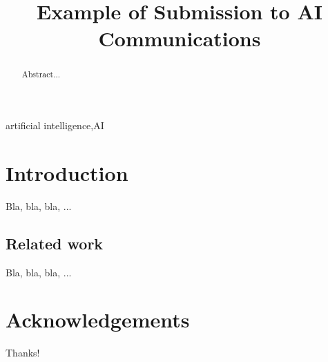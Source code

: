 \documentclass{aicom2e}
\begin{document}
\begin{frontmatter}                           %
%
\title{Example of Submission to AI Communications}
\maketitle
%
\author[]{ %
}
\address{King's College London\\ London, UK\\
E-mail: aicom@kcl.ac.uk}

\begin{abstract}
Abstract...

\end{abstract}

\begin{keyword}
artificial intelligence\sep AI
\end{keyword}
%
\end{frontmatter}

\section*{Introduction}

Bla, bla, bla, ...

\subsection*{Related work}
Bla, bla, bla, ...



\section*{Acknowledgements}
Thanks!

% 
% 
\end{document}
